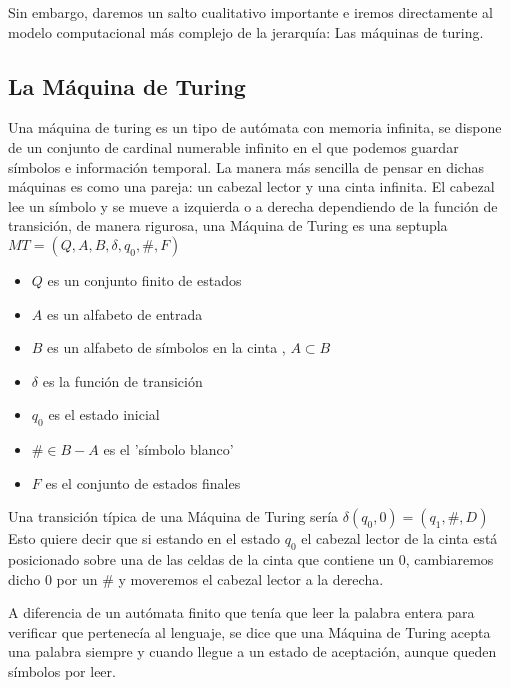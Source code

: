 Sin embargo, daremos un salto cualitativo importante e iremos directamente al modelo computacional más complejo de la jerarquía: Las máquinas de turing.



\subsection{La Máquina de Turing}

 Una máquina de turing es un tipo de autómata con memoria infinita, se dispone de un conjunto de cardinal numerable infinito en el que podemos guardar símbolos e información temporal. La manera más sencilla de pensar en dichas máquinas es como una pareja: un cabezal lector y una cinta infinita. El cabezal lee un símbolo y se mueve a izquierda o a derecha dependiendo de la función de transición, de manera rigurosa, una Máquina de Turing es una septupla $MT=(Q,A,B,\delta,q_0,\#,F)$


\begin{multicols}{2}
	\begin{itemize}
		\item $Q$ es un conjunto finito de estados
		\item $A$ es un alfabeto de entrada
		\item $B$ es un alfabeto de símbolos en la cinta , $A\subset B$
		\item $\delta$ es la función de transición
		\item $q_0$ es el estado inicial
		\item $\# \in B-A$ es el 'símbolo blanco'	
		\item $F$ es el conjunto de estados finales 
	\end{itemize}
\end{multicols} 
 
 
 Una transición típica de una Máquina de Turing sería $\delta(q_0,0)=(q_1,\#,D)$ Esto quiere decir que si estando en el estado $q_0$ el cabezal lector de la cinta está posicionado sobre una de las celdas de la cinta que contiene un 0, cambiaremos dicho 0 por un $\#$ y moveremos el cabezal lector a la derecha.
 
 \vspace{10px}
 
 A diferencia de un autómata finito que tenía que leer la palabra entera para verificar que pertenecía al lenguaje, se dice que una Máquina de Turing acepta una palabra siempre y cuando llegue a un estado de aceptación, aunque queden símbolos por leer.
 
